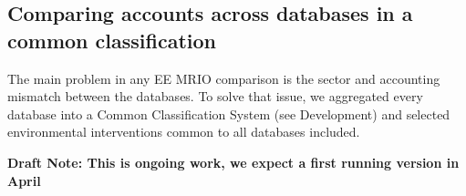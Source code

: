 \subsection{Comparing accounts across databases in a common classification}

The main problem in any EE MRIO comparison is the sector and accounting
mismatch between the databases. To solve that issue, we aggregated every
database into a Common Classification System (see Development) and
selected environmental interventions common to all databases included.

\textbf{Draft Note: This is ongoing work, we expect a first running version in April}
